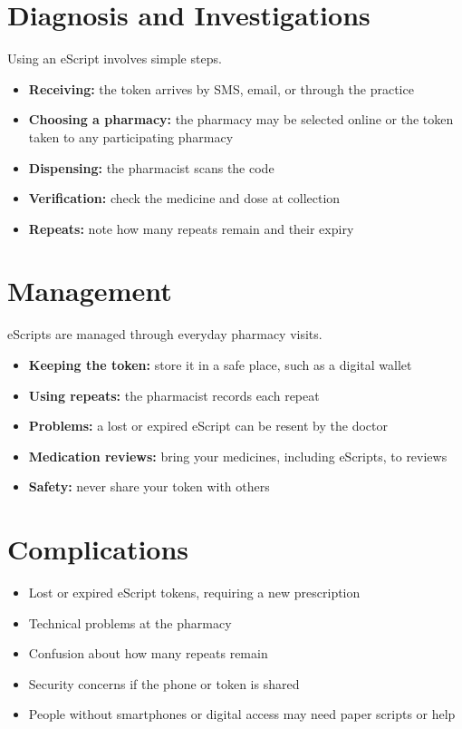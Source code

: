 \section*{Diagnosis and Investigations}
Using an eScript involves simple steps.
\begin{itemize}
    \item \textbf{Receiving:} the token arrives by SMS, email, or through the practice
    \item \textbf{Choosing a pharmacy:} the pharmacy may be selected online or the token taken to any participating pharmacy
    \item \textbf{Dispensing:} the pharmacist scans the code
    \item \textbf{Verification:} check the medicine and dose at collection
    \item \textbf{Repeats:} note how many repeats remain and their expiry
\end{itemize}

\section*{Management}
eScripts are managed through everyday pharmacy visits.
\begin{itemize}
    \item \textbf{Keeping the token:} store it in a safe place, such as a digital wallet
    \item \textbf{Using repeats:} the pharmacist records each repeat
    \item \textbf{Problems:} a lost or expired eScript can be resent by the doctor
    \item \textbf{Medication reviews:} bring your medicines, including eScripts, to reviews
    \item \textbf{Safety:} never share your token with others
\end{itemize}

\section*{Complications}
\begin{itemize}
    \item Lost or expired eScript tokens, requiring a new prescription
    \item Technical problems at the pharmacy
    \item Confusion about how many repeats remain
    \item Security concerns if the phone or token is shared
    \item People without smartphones or digital access may need paper scripts or help
\end{itemize}

